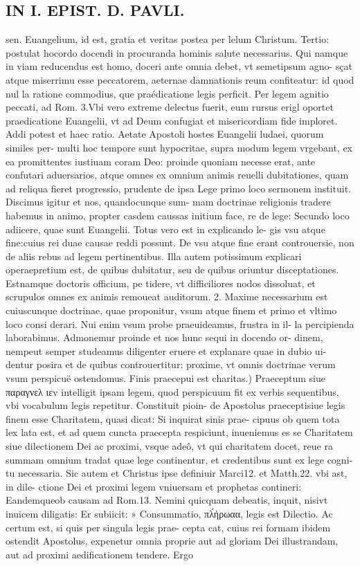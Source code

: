 \documentclass{article}
\begin{document}
\begin{pages}
\section*{IN I. EPIST. D. PAVLI. }
\marginpar{[ p.21 ]}\pstart sen. Euangelium, id est, gratia et veritas postea per lelum Christum.  \pend\pstart Tertio: postulat hocordo docendi in procuranda hominis salute necessarius. Qui namque  in viam reducendus est homo, doceri ante omnia debet, vt semetipsum agno- sçat atque  miserrimu esse peccatorem, aeternae damnationis reum confiteatur: id quod nul la ratione commodius, que  praédicatione legis perficit. Per legem agnitio peccati, ad Rom. 3.Vbi vero extreme delectus fuerit, eum rursus erigl oportet praedicatione Euangelii, vt ad Deum confugiat et misericordiam fide imploret.  \pend\pstart Addi potest et haec ratio. Aetate Apostoli hostes Euangelii ludaei, quorum similes per- multi hoc tempore sunt hypocritae, supra modum legem vrgebant, ex ea promittentes iustiuam coram Deo: proinde quoniam necesse erat, ante confutari aduersarios, atque omnes ex omnium animis reuelli dubitationes, quam ad reliqua fieret progressio, prudente de ipsa Lege primo loco sermonem instituit. Discimus igitur et nos, quandocunque  sum- mam doctrinae religionis tradere habemus in animo, propter casdem caussas initium face, re de lege: Secundo loco adiicere, quae sunt Euangelii. Totus vero est in explicando le- gis vsu atque  fine:cuius rei duae causae reddi possunt. De vsu atque  fine erant controuersie, non de aliis rebus ad legem pertinentibus. Illa autem potissimum explicari operaepretium est, de quibus dubitatur, seu de quibus oriuntur disceptationes. Estnamque  doctoris officium, pe tidere, vt difficiliores nodos dissoluat, et scrupulos omnes ex animis remoueat auditorum. 2. Maxime necessarium est cuiuscunque  doctrinae, quae proponitur, vsum atque  finem et primo et vltimo loco consi derari. Nui enim vsum probe praeuideamus, frustra in il- la percipienda laborabimus. Admonemur proinde et nos hunc sequi in docendo or- dinem, nempeut semper studeamus diligenter eruere et explanare quae in dubio ui- dentur posira et de quibus controuertitur: proxime, vt omnis doctrinae verum vsum perspicuë ostendomus.  \pend\pstart Finis praecepui est charitas.) Praeceptum siue παραγνελ ιεv intelligit ipsam legem, quod perspicuum fit ex verbis sequentibus, vbi vocabulum legis repetitur. Constituit pioin- de Apostolus praeceptisiue legis finem esse Charitatem, quasi dicat: Si inquirat sinis prae- cipuus ob quem tota lex lata est, et ad quem cuncta praecepta respiciunt, inueniemus es se Charitatem siue dilectionem Dei ac proximi, vsque  adeô, vt qui charitatem docet, reue ra summam omnium tradat quae lege continentur, et credentibus sunt ex lege cogni- tu necessaria. Sic autem et Christus ipse definiuir Marci12. et Matth.22. vbi ast, in dile- ctione Dei et proximi legem vniuersam et prophetas contineri: Eandemqueob causam   ad Rom.13. Nemini quicquam debeatis, inquit, nisivt inuicem diligatis: Er subiicit: » Consummatio, πλ́ήρωαα, legis est Dilectio. Ac certum est, si quis per singula legis prae- cepta cat, cuius rei formam ibidem ostendit Apostolus, expenetur omnia proprie aut ad gloriam Dei illustrandam, aut ad proximi aedificationem tendere. Ergo 
\end{pages}
\end{document}
